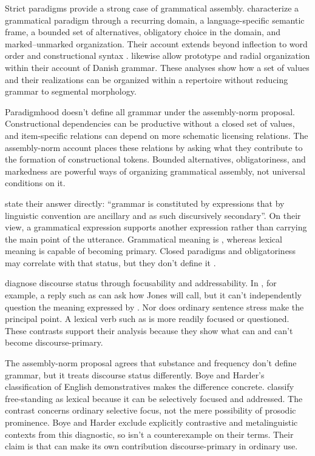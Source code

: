 \documentclass[12pt,letterpaper]{article}
\begin{document}
Strict paradigms provide a strong case of grammatical assembly.
\textcite[262--263]{norgardsorensenheltoft2015} characterize a grammatical paradigm through
a recurring domain, a language-specific semantic frame, a bounded set of
alternatives, obligatory choice in the domain, and marked--unmarked organization.
Their account extends beyond inflection to word order and constructional
syntax \citep[275--285]{norgardsorensenheltoft2015}.
\textcite[vol.~1, 39--42]{hansenheltoft2011gds} likewise allow prototype and radial
organization within their account of Danish grammar. These analyses show how a
set of values and their realizations can be organized within a repertoire without reducing
grammar to segmental morphology.

Paradigmhood doesn't define all grammar under the assembly-norm proposal.
Constructional dependencies can be productive without a closed set of values,
and item-specific relations can depend on more schematic licensing relations. The
assembly-norm account places these relations by asking what they contribute to
the formation of constructional tokens. Bounded alternatives, obligatoriness,
and markedness are powerful ways of organizing grammatical assembly, not universal
conditions on it.

\textcite[1]{boyeharder2012} state their answer directly: \enquote{grammar is
constituted by expressions that by linguistic convention are ancillary and as
such discursively secondary}. On their view, a grammatical expression supports
another expression rather than carrying the main point of the utterance. Grammatical
meaning is , whereas lexical meaning is
capable of becoming primary. Closed paradigms and obligatoriness may correlate
with that status, but they don't define it \citep[30--32]{boyeharder2012}.

\textcite[15--18]{boyeharder2012} diagnose discourse status through focusability
and addressability.
In , for example, a reply such as
 can ask how Jones will call, but it can't independently question
the meaning expressed by . Nor does ordinary sentence stress make
 the principal point. A lexical verb such as  is more
readily focused or questioned. These contrasts support their analysis because
they show what can and can't become discourse-primary.

The assembly-norm proposal agrees that substance and frequency don't define
grammar, but it treats discourse status differently. Boye and Harder's
classification of English demonstratives makes the difference concrete.
\textcite[20--21]{boyeharder2012} classify free-standing  as lexical
because it can be selectively focused and addressed. The contrast concerns
ordinary selective focus, not the mere
possibility of prosodic prominence. Boye and Harder exclude explicitly
contrastive and metalinguistic contexts from this diagnostic, so  isn't a counterexample on their terms. Their claim is that
 can make its own contribution discourse-primary in ordinary use.
\end{document}

